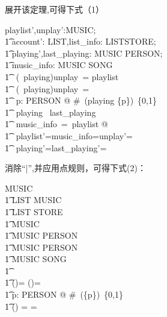 \documentclass[14pt]{article}
\numberwithin{figure}{subsection}
\begin{document}
\begin{minipage}[t]{0.52\linewidth}
    展开该定理,可得下式（1）
    \begin{syntax}
        \vdash \exists playlist',unplay':\power MUSIC;\\
        \t1  account': LIST,list\_info: LIST\pfun STORE;\\
        \t1  playing',last\_playing: MUSIC \pfun PERSON;\\
        \t1  music\_info: MUSIC \pfun SONG\\
        \t1 \ (\dom \ playing)\cup unplay\ = playlist\\
        \t1 \ (\dom \ playing)\cap unplay\ = \emptyset\\
        \t1 \ \forall p: PERSON @ \#~(playing \rres \{p\})\subseteq\ \{0,1\}\\
        \t1 \ playing \subseteq \ last\_playing\\
        \t1 \ \dom music\_info\ =\ playlist @\\
        \t1 \ playlist'=\emptyset \wedge music\_info=\emptyset \wedge unplay'=\emptyset \ \wedge\\
        \t1 \ playing'=\emptyset \wedge last\_playing'=\emptyset
    \end{syntax}
\end{minipage}
\hfill
\begin{minipage}[t]{0.45\linewidth}
    消除“|”,并应用点规则，可得下式(2)：
    \begin{argue}
        \vdash \emptyset \in \power MUSIC \wedge \\
        \t1 \emptyset \in \power LIST \wedge \emptyset \in \power MUSIC \wedge\\
        \t1 \emptyset \in \power LIST \pfun STORE \\
        \t1 \emptyset \in  \nat \pfun MUSIC \\
        \t1 \emptyset \in \power MUSIC \pfun PERSON\ \wedge\\
        \t1  \emptyset \in \power MUSIC \pfun PERSON \wedge \\
        \t1 \emptyset \in \power MUSIC \pfun SONG\\
        \t1 \emptyset \mapsto \emptyset\\
        \t1 (\dom \emptyset)\cup \emptyset = \emptyset \wedge (\dom \emptyset)\cap \emptyset = \emptyset\\
        \t1 \forall p: PERSON @ \#~(\emptyset \rres \{p\})\subseteq\ \{0,1\}\\
        \t1 \emptyset \subseteq \emptyset \wedge (\dom \emptyset) = \emptyset \wedge\dom \emptyset = \emptyset\\
    \end{argue}
\end{minipage}
\end{document}
